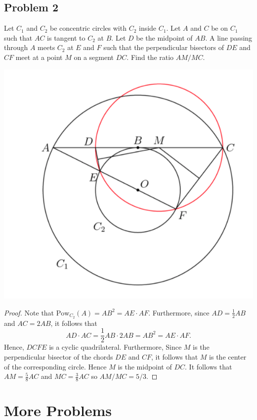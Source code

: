 \documentclass[12pt]{scrartcl}
\newcommand{\<}{\langle}
\renewcommand{\>}{\rangle}
\begin{document}
\subsection{Problem 2}
\begin{Prob} Let $C_1$ and $C_2$ be concentric circles with $C_2$ inside $C_1$.  Let $A$ and $C$ be on $C_1$ such that $AC$ is tangent to $C_2$ at $B$.  Let $D$ be the midpoint of $AB$.  A line passing through $A$ meets $C_2$ at $E$ and $F$ such that the perpendicular bisectors of $DE$ and $CF$ meet at a point $M$ on a segment $DC$.  Find the ratio $AM/MC$.
\end{Prob}
\begin{center}
\includegraphics[scale=0.4]{graphics/hw1-2.png}
\end{center}
\begin{proof}
Note that $\text{Pow}_{C_2}(A) = AB^2 = AE \cdot AF$.  Furthermore, since $AD = \frac{1}{2}AB$ and $AC = 2AB$, it follows that 
$$AD \cdot AC = \frac{1}{2}AB \cdot 2AB = AB^2 = AE \cdot AF.$$
Hence, $DCFE$ is a cyclic quadrilateral.  Furthermore,  Since $M$ is the perpendicular bisector of the chords $DE$ and $CF$, it follows that $M$ is the center of the corresponding circle.  Hence $M$ is the midpoint of $DC$.  It follows that $AM = \frac{5}{8}AC$ and $MC = \frac{3}{8}AC$ so $AM/MC = 5/3$.
\end{proof}
\pagebreak
\section{More Problems}
\end{document}
